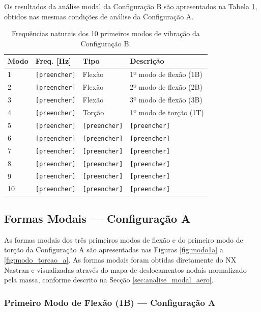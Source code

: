 \documentclass[a4paper,fleqn,noprintline]{cas-dc}
\begin{document}
Os resultados da análise modal da Configuração B são apresentados na Tabela \ref{tab:freqs_b}, obtidos nas mesmas condições de análise da Configuração A.

\begin{table}[h!]
\centering
\caption{Frequências naturais dos 10 primeiros modos de 
vibração da Configuração B.}
\label{tab:freqs_b}
\renewcommand{\arraystretch}{1.4}
\begin{tabularx}{\textwidth}{p{1.5cm} p{3cm} X X}
\toprule
\textbf{Modo} & \textbf{Freq. [\si{\hertz}]} & 
\textbf{Tipo} & \textbf{Descrição} \\
\midrule
1  & \texttt{[preencher]} & Flexão & 1º modo de flexão (1B) \\
2  & \texttt{[preencher]} & Flexão & 2º modo de flexão (2B) \\
3  & \texttt{[preencher]} & Flexão & 3º modo de flexão (3B) \\
4  & \texttt{[preencher]} & Torção & 1º modo de torção (1T) \\
5  & \texttt{[preencher]} & \texttt{[preencher]} & \texttt{[preencher]} \\
6  & \texttt{[preencher]} & \texttt{[preencher]} & \texttt{[preencher]} \\
7  & \texttt{[preencher]} & \texttt{[preencher]} & \texttt{[preencher]} \\
8  & \texttt{[preencher]} & \texttt{[preencher]} & \texttt{[preencher]} \\
9  & \texttt{[preencher]} & \texttt{[preencher]} & \texttt{[preencher]} \\
10 & \texttt{[preencher]} & \texttt{[preencher]} & \texttt{[preencher]} \\
\bottomrule
\end{tabularx}
\end{table}

\subsection{Formas Modais --- Configuração A}

As formas modais dos três primeiros modos de flexão e do primeiro modo de torção da Configuração A são apresentadas nas Figuras \ref{fig:modo1a} a \ref{fig:modo_torcao_a}. As formas modais foram obtidas diretamente do NX Nastran e visualizadas através do mapa de deslocamentos nodais normalizado pela massa, conforme descrito na Secção \ref{sec:analise_modal_aero}.

\subsubsection{Primeiro Modo de Flexão (1B) --- Configuração A}
\end{document}
